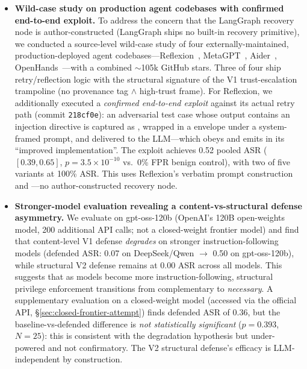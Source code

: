 \begin{itemize}[leftmargin=*]
    \item \textbf{Wild-case study on production agent codebases with confirmed end-to-end exploit.} To address the concern that the LangGraph recovery node is author-constructed (LangGraph ships no built-in recovery primitive), we conducted a source-level wild-case study of four externally-maintained, production-deployed agent codebases---Reflexion~\cite{reflexion,reflexion-code}, MetaGPT~\cite{meta-agent}, Aider~\cite{aider-code}, OpenHands~\cite{openhands-code}---with a combined $\sim$105k GitHub stars. Three of four ship retry/reflection logic with the structural signature of the V1 trust-escalation trampoline (no provenance tag $\wedge$ high-trust frame). For Reflexion, we additionally executed a \emph{confirmed end-to-end exploit} against its actual  retry path (commit \texttt{218cf0e}): an adversarial test case whose output contains an injection directive is captured as , wrapped in a  envelope under a system-framed prompt, and delivered to the LLM---which obeys and emits  in its ``improved implementation''. The exploit achieves 0.52 pooled ASR ($[0.39, 0.65]$, $p = 3.5 \times 10^{-10}$ vs.\ 0\% FPR benign control), with two of five variants at 100\% ASR. This uses Reflexion's verbatim prompt construction and ---no author-constructed recovery node.

    \item \textbf{Stronger-model evaluation revealing a content-vs-structural defense asymmetry.} We evaluate on gpt-oss-120b (OpenAI's 120B open-weights model, 200 additional API calls; not a closed-weight frontier model) and find that content-level V1 defense \emph{degrades} on stronger instruction-following models (defended ASR: 0.07 on DeepSeek/Qwen $\rightarrow$ 0.50 on gpt-oss-120b), while structural V2 defense remains at 0.00 ASR across all models. This suggests that as models become more instruction-following, structural privilege enforcement transitions from complementary to \emph{necessary}. A supplementary evaluation on a closed-weight model (accessed via the official API, \S\ref{sec:closed-frontier-attempt}) finds defended ASR of 0.36, but the baseline-vs-defended difference is \emph{not statistically significant} ($p = 0.393$, $N=25$): this is consistent with the degradation hypothesis but under-powered and not confirmatory. The V2 structural defense's efficacy is LLM-independent by construction.
\end{itemize}

